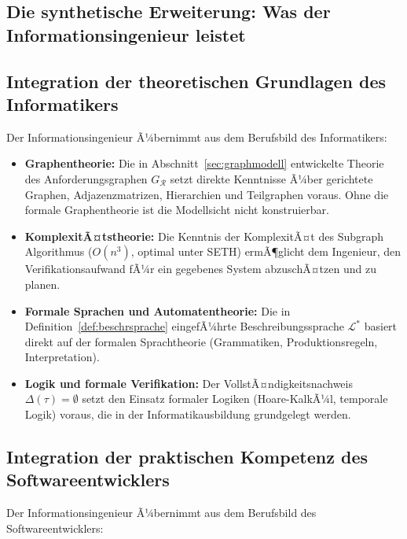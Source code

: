 ﻿\documentclass[a4paper,12pt]{report}
\theoremstyle{definition}
\begin{document}
\subsection{Die synthetische Erweiterung: Was der Informationsingenieur leistet}

\subsection{Integration der theoretischen Grundlagen des Informatikers}

Der Informationsingenieur Ã¼bernimmt aus dem Berufsbild des Informatikers:

\begin{itemize}
  \item \textbf{Graphentheorie:} Die in Abschnitt~\ref{sec:graphmodell} entwickelte
        Theorie des Anforderungsgraphen $G_\mathcal{R}$ setzt direkte Kenntnisse
        Ã¼ber gerichtete Graphen, Adjazenzmatrizen, Hierarchien und Teilgraphen voraus.
        Ohne die formale Graphentheorie ist die Modellsicht nicht konstruierbar.
  \item \textbf{KomplexitÃ¤tstheorie:} Die Kenntnis der KomplexitÃ¤t des Subgraph Algorithmus
        ($O(n^3)$, optimal unter SETH) ermÃ¶glicht dem Ingenieur, den Verifikationsaufwand
        fÃ¼r ein gegebenes System abzuschÃ¤tzen und zu planen.
  \item \textbf{Formale Sprachen und Automatentheorie:}
        Die in Definition~\ref{def:beschrsprache} eingefÃ¼hrte Beschreibungssprache
        $\mathcal{L}^*$ basiert direkt auf der formalen Sprachtheorie
        (Grammatiken, Produktionsregeln, Interpretation).
  \item \textbf{Logik und formale Verifikation:}
        Der VollstÃ¤ndigkeitsnachweis $\Delta(\tau) = \emptyset$ setzt den Einsatz
        formaler Logiken (Hoare-KalkÃ¼l, temporale Logik) voraus, die in der
        Informatikausbildung grundgelegt werden.
\end{itemize}

\subsection{Integration der praktischen Kompetenz des Softwareentwicklers}

Der Informationsingenieur Ã¼bernimmt aus dem Berufsbild des Softwareentwicklers:
\end{document}
